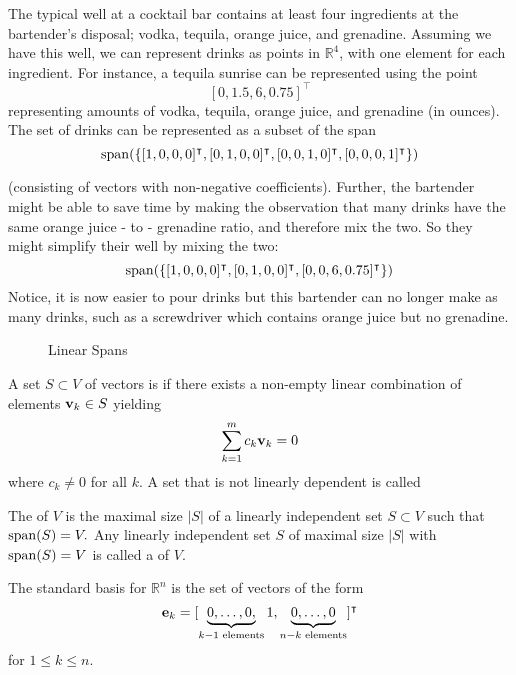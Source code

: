\begin{example}
The typical well at a cocktail bar contains at least four ingredients at the bartender's disposal; vodka, tequila, orange juice, and grenadine. Assuming we have this well, we can represent drinks as points in $\mathbb R^4$, with one element for each ingredient. For instance, a tequila sunrise can be represented using the point 
$$[0, 1.5, 6, 0.75]^\intercal$$
representing amounts of vodka, tequila, orange juice, and grenadine (in ounces). The set of drinks can be represented as a subset of the span 
$$\spann(\{ [1,0,0,0]^\intercal, [0,1,0,0]^\intercal, [0,0,1,0]^\intercal,[0,0,0,1]^\intercal\})$$

(consisting of vectors with non-negative coefficients). Further, the bartender might be able to save time by making the observation that many drinks have the same orange juice - to - grenadine ratio, and therefore mix the two. So they might simplify their well by mixing the two: 
$$\spann(\{[1,0,0,0]^\intercal, [0,1,0,0]^\intercal, [0,0,6,0.75]^\intercal\})$$
Notice, it is now easier to pour drinks but this bartender can no longer make as many drinks, such as a screwdriver which contains orange juice but no grenadine.  
\end{example}

\begin{figure}[H]%
\centering
{}
\hfill
\caption{Linear Spans}
\end{figure}

\begin{definition}
A set $S \subset V$ of vectors is  if there exists a non-empty linear combination of elements $\vv_k \in S$ yielding 
$$\sum_{k = 1}^m c_k \vv_k = 0$$
where $c_k \not = 0$ for all $k$. A set that is not linearly dependent is called 
\end{definition}

\begin{definition}
The  of $V$ is the maximal size $|S|$ of a linearly independent set $S \subset V$ such that $\spann(S) = V.$
Any linearly independent set $S$ of maximal size $|S|$ with $\spann(S) = V$ is called a  of $V$.
\end{definition}

\begin{example}
The standard basis for $\mathbb R^n$ is the set of vectors of the form 
$$\ve_k = [ \underbrace{0, \ldots, 0,}_{k - 1 \text{ elements}} 1, \underbrace{0, \ldots, 0}_{n - k \text{ elements}}]^\intercal$$
for $1\leq k\leq n$.
\end{example}

